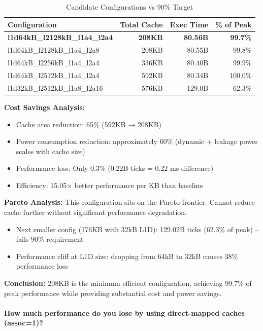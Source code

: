 \documentclass[11pt,a4paper]{article}
\begin{document}
\begin{table}[H]
\centering
\caption{Candidate Configurations vs 90\% Target}
\begin{tabular}{lrrr}
\toprule
\textbf{Configuration} & \textbf{Total Cache} & \textbf{Exec Time} & \textbf{\% of Peak} \\
\midrule
\textbf{l1d64kB\_l2128kB\_l1a4\_l2a4} & \textbf{208KB} & \textbf{80.56B} & \textbf{99.7\%} \\
l1d64kB\_l2128kB\_l1a4\_l2a8 & 208KB & 80.55B & 99.8\% \\
l1d64kB\_l2256kB\_l1a4\_l2a4 & 336KB & 80.40B & 99.9\% \\
l1d64kB\_l2512kB\_l1a4\_l2a4 & 592KB & 80.34B & 100.0\% \\
\midrule
l1d32kB\_l2512kB\_l1a8\_l2a16 & 576KB & 129.0B & 62.3\% \\
\bottomrule
\end{tabular}
\end{table}

\textbf{Cost Savings Analysis:}

\begin{itemize}[noitemsep]
    \item Cache area reduction: 65\% (592KB → 208KB)
    \item Power consumption reduction: approximately 60\% (dynamic + leakage power scales with cache size)
    \item Performance loss: Only 0.3\% (0.22B ticks = 0.22 ms difference)
    \item Efficiency: 15.05× better performance per KB than baseline
\end{itemize}

\textbf{Pareto Analysis:} This configuration sits on the Pareto frontier. Cannot reduce cache further without significant performance degradation:
\begin{itemize}[noitemsep]
    \item Next smaller config (176KB with 32kB L1D): 129.02B ticks (62.3\% of peak) -- fails 90\% requirement
    \item Performance cliff at L1D size: dropping from 64kB to 32kB causes 38\% performance loss
\end{itemize}

\textbf{Conclusion:} 208KB is the minimum efficient configuration, achieving 99.7\% of peak performance while providing substantial cost and power savings.

\paragraph{How much performance do you lose by using direct-mapped caches (assoc=1)?}
\end{document}
